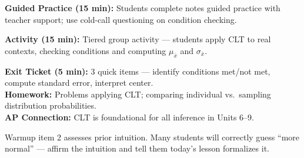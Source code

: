 \documentclass[10pt]{article}
\begin{document}
\begin{practicebox}
\textbf{Guided Practice (15 min):} Students complete notes guided practice with teacher support; use cold-call questioning on condition checking.
\end{practicebox}

\begin{notesbox}
\textbf{Activity (15 min):} Tiered group activity — students apply CLT to real contexts, checking conditions and computing $\mu_{\bar{x}}$ and $\sigma_{\bar{x}}$.
\end{notesbox}

\begin{reflectionbox}
\textbf{Exit Ticket (5 min):} 3 quick items — identify conditions met/not met, compute standard error, interpret center.\\
\textbf{Homework:} Problems applying CLT; comparing individual vs.\ sampling distribution probabilities.\\
\textbf{AP Connection:} CLT is foundational for all inference in Units 6–9.
\end{reflectionbox}


\begin{teachernote}[Warm-Up]
Warmup item 2 assesses prior intuition. Many students will correctly guess ``more normal'' --- affirm the intuition and tell them today's lesson formalizes it.
\end{teachernote}
\end{document}
